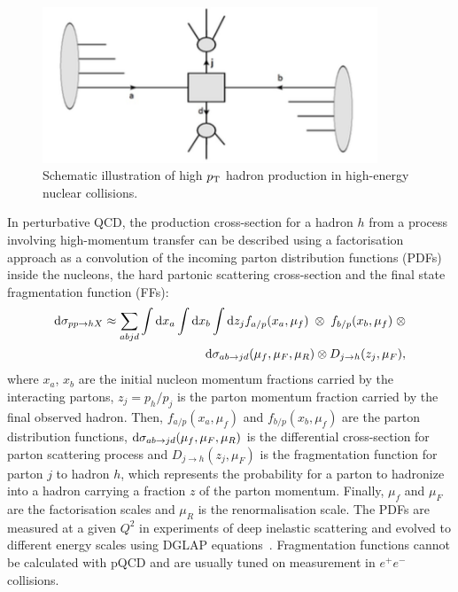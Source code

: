 \begin{figure}[!ht]
  \centering
  \includegraphics[width=10cm]{FigCap1/Scattering.png}
  \caption{Schematic illustration of high $p_{\rm T}$ hadron production in high-energy nuclear collisions. }
  \label{fig:Scattering}
\end{figure}

In perturbative QCD, the production cross-section for a hadron $h$ 
from a process involving high-momentum transfer can be described 
using a factorisation approach as a convolution of the incoming parton distribution functions (PDFs) 
inside the nucleons, the hard partonic scattering cross-section and 
the final state fragmentation function (FFs):
\begin{equation}
\label{eq:QCDhardProduction}
\begin{split}
{\rm d}\sigma_{pp\rightarrow hX} \approx \sum_{abjd}\int {\rm d}x_a \int {\rm d}x_b \int {\rm d}z_j f_{a/p} (x_a, \mu_f) \; \otimes \;f_{b/p} (x_b, \mu_f) \;\otimes \\
{\rm d}\sigma_{ab \rightarrow jd} (\mu_f,\mu_F,\mu_R) \otimes D_{j\rightarrow h} (z_j,\mu_F), 
\end{split}
\end{equation}
where $x_a$, $x_b$ are the initial nucleon momentum fractions carried by the
 interacting partons, $z_j = p_h/p_j$ is the parton momentum 
 fraction carried by the final observed hadron. Then, $f_{a/p} (x_a, \mu_f)$
  and $f_{b/p} (x_b, \mu_f) $ are the parton distribution functions, 
  ${\rm d}\sigma_{ab \rightarrow jd} (\mu_f,\mu_F,\mu_R) $ is the differential 
  cross-section for parton scattering process and $D_{j\rightarrow h} (z_j,\mu_F)$
   is the fragmentation function for parton $j$ to hadron $h$, which represents
    the probability for a parton to hadronize into a hadron carrying a fraction $z$ 
    of the parton momentum. Finally, $\mu_f$ and $\mu_F$ are the factorisation 
    scales and $\mu_R$ is the renormalisation scale. The PDFs are measured 
    at a given $Q^2$ in experiments of deep inelastic scattering and evolved
     to different energy scales using DGLAP equations~\cite{Altarelli:1977zs}.
      Fragmentation functions cannot be calculated with pQCD and are usually 
      tuned on measurement in $e^+e^-$ collisions.\\


